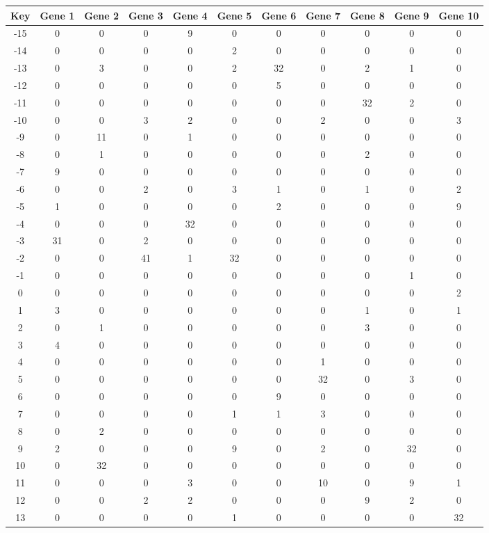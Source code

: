 \begin{tabular}{|c|c|c|c|c|c|c|c|c|c|c|}
\hline
Key & Gene 1 & Gene 2 & Gene 3 & Gene 4 & Gene 5 & Gene 6 & Gene 7 & Gene 8 & Gene 9 & Gene 10 \\
\hline
-15 & 0 & 0 & 0 & 9 & 0 & 0 & 0 & 0 & 0 & 0 \\
-14 & 0 & 0 & 0 & 0 & 2 & 0 & 0 & 0 & 0 & 0 \\
-13 & 0 & 3 & 0 & 0 & 2 & 32 & 0 & 2 & 1 & 0 \\
-12 & 0 & 0 & 0 & 0 & 0 & 5 & 0 & 0 & 0 & 0 \\
-11 & 0 & 0 & 0 & 0 & 0 & 0 & 0 & 32 & 2 & 0 \\
-10 & 0 & 0 & 3 & 2 & 0 & 0 & 2 & 0 & 0 & 3 \\
-9 & 0 & 11 & 0 & 1 & 0 & 0 & 0 & 0 & 0 & 0 \\
-8 & 0 & 1 & 0 & 0 & 0 & 0 & 0 & 2 & 0 & 0 \\
-7 & 9 & 0 & 0 & 0 & 0 & 0 & 0 & 0 & 0 & 0 \\
-6 & 0 & 0 & 2 & 0 & 3 & 1 & 0 & 1 & 0 & 2 \\
-5 & 1 & 0 & 0 & 0 & 0 & 2 & 0 & 0 & 0 & 9 \\
-4 & 0 & 0 & 0 & 32 & 0 & 0 & 0 & 0 & 0 & 0 \\
-3 & 31 & 0 & 2 & 0 & 0 & 0 & 0 & 0 & 0 & 0 \\
-2 & 0 & 0 & 41 & 1 & 32 & 0 & 0 & 0 & 0 & 0 \\
-1 & 0 & 0 & 0 & 0 & 0 & 0 & 0 & 0 & 1 & 0 \\
0 & 0 & 0 & 0 & 0 & 0 & 0 & 0 & 0 & 0 & 2 \\
1 & 3 & 0 & 0 & 0 & 0 & 0 & 0 & 1 & 0 & 1 \\
2 & 0 & 1 & 0 & 0 & 0 & 0 & 0 & 3 & 0 & 0 \\
3 & 4 & 0 & 0 & 0 & 0 & 0 & 0 & 0 & 0 & 0 \\
4 & 0 & 0 & 0 & 0 & 0 & 0 & 1 & 0 & 0 & 0 \\
5 & 0 & 0 & 0 & 0 & 0 & 0 & 32 & 0 & 3 & 0 \\
6 & 0 & 0 & 0 & 0 & 0 & 9 & 0 & 0 & 0 & 0 \\
7 & 0 & 0 & 0 & 0 & 1 & 1 & 3 & 0 & 0 & 0 \\
8 & 0 & 2 & 0 & 0 & 0 & 0 & 0 & 0 & 0 & 0 \\
9 & 2 & 0 & 0 & 0 & 9 & 0 & 2 & 0 & 32 & 0 \\
10 & 0 & 32 & 0 & 0 & 0 & 0 & 0 & 0 & 0 & 0 \\
11 & 0 & 0 & 0 & 3 & 0 & 0 & 10 & 0 & 9 & 1 \\
12 & 0 & 0 & 2 & 2 & 0 & 0 & 0 & 9 & 2 & 0 \\
13 & 0 & 0 & 0 & 0 & 1 & 0 & 0 & 0 & 0 & 32 \\
\hline
\end{tabular}